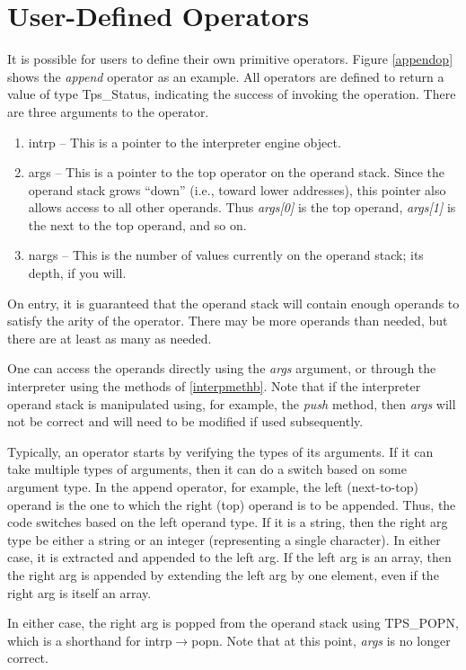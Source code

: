 \section{User-Defined Operators}
\label{userdefops}
It is possible for users to define their own primitive operators.
Figure \ref{appendop} shows the {\em append} operator
as an example.
All operators are defined to return a value of type Tps\_Status,
indicating the success of invoking the operation.
There are three arguments to the operator.
\begin{enumerate}
\item intrp -- This is a pointer to the interpreter engine
object.
\item args -- This is a pointer to the top operator on
the operand stack.  Since the operand stack grows ``down''
(i.e., toward lower addresses), this pointer also allows
access to all other operands.
Thus
{\em args[0]} is the top operand,
{\em args[1]} is the next to the top operand,
and so on.
\item nargs -- This is the number of values currently
on the operand stack; its depth, if you will.
\end{enumerate}
On entry, it is guaranteed that the operand stack will
contain enough operands to satisfy the arity of the operator.
There may be more operands than needed, but there are at least
as many as needed.

One can access the operands directly
using the {\em args} argument, or
through the interpreter using the methods of \ref{interpmethb}.
Note that if the interpreter
operand stack is manipulated using, for example, the {\em push}
method, then {\em args} will not be correct and will need
to be modified if used subsequently.

Typically, an operator starts by verifying the types
of its arguments.
If it can take multiple types of arguments, then
it can do a switch based on some argument type.
In the append operator, for example,
the left (next-to-top) operand is the one to which the right (top)
operand is to be appended.
Thus, the code switches based on the left operand type.
If it is a string, then the right arg type be either a string
or an integer (representing a single character).
In either case, it is extracted and appended to the left arg.
If the left arg is an array, then the right arg is
appended by extending the left arg by one element,
even if the right arg is itself an array.

In either case, the right arg is popped from the operand stack
using TPS\_POPN, which is a shorthand for
intrp$\rightarrow$popn.
Note that at this point, {\em args} is no longer correct.

